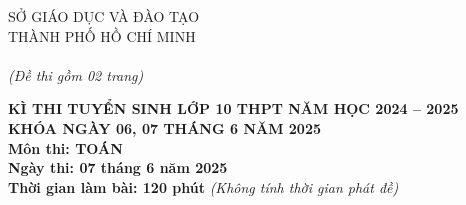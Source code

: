 \documentclass[12pt]{article}
\begin{document}
\begin{center}
    \begin{minipage}[t]{0.33\textwidth}
        \centering
        SỞ GIÁO DỤC VÀ ĐÀO TẠO \\
        THÀNH PHỐ HỒ CHÍ MINH \\
        \smallskip
         \\
        \vspace{0.3cm}
        \textit{(Đề thi gồm 02 trang)}
    \end{minipage}
    \begin{minipage}[t]{0.66\textwidth}
        \centering
        \textbf{KÌ THI TUYỂN SINH LỚP 10 THPT NĂM HỌC 2024 – 2025}\\
        \textbf{KHÓA NGÀY 06, 07 THÁNG 6 NĂM 2025} \\
        \textbf{Môn thi: TOÁN} \\
        \textbf{Ngày thi: 07 tháng 6 năm 2025} \\
        \textbf{Thời gian làm bài: 120 phút} \textit{(Không tính thời gian phát đề)} \\
    \end{minipage}
\end{center}
\end{document}
